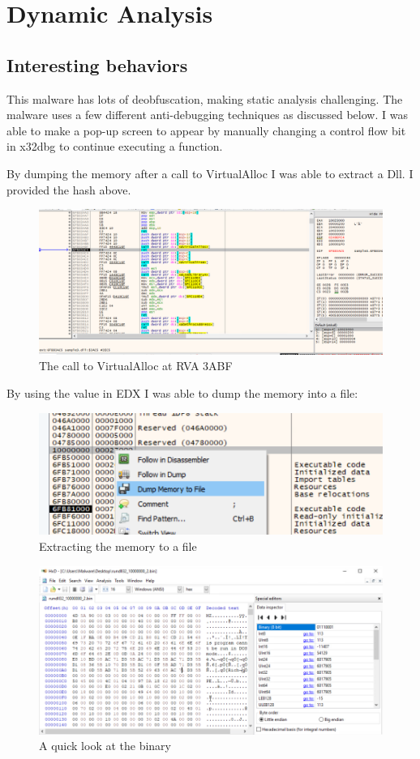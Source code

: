 \documentclass{article}
\begin{document}
    \section{Dynamic Analysis}
    \subsection{Interesting behaviors}
    This malware has lots of deobfuscation, making static analysis challenging. The malware uses a few different anti-debugging techniques as discussed below. I was able to make a pop-up screen to appear by manually changing a control flow bit in x32dbg to continue executing a function.

    By dumping the memory after a call to VirtualAlloc I was able to extract a Dll. I provided the hash above.
    \begin{figure}[H]
        \includegraphics[width=\textwidth]{virtalloc.png}
        \caption{The call to VirtualAlloc at RVA 3ABF}
    \end{figure}
    By using the value in EDX I was able to dump the memory into a file:
    \begin{figure}[H]
        \includegraphics[width=\textwidth]{dump.png}
        \caption{Extracting the memory to a file}
    \end{figure}
    \begin{figure}[H]
        \includegraphics[width=\textwidth]{hxdump.png}
        \caption{A quick look at the binary}
    \end{figure}
\end{document}
